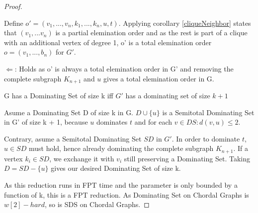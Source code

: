 \begin{proof}
\begin{subproof}
    Define $o' = (v_1, ..., v_n, k_1, ..., k_n, u, t)$. Applying corollary \ref*{cliqueNeighbor} states that $(v_1, ... v_n)$ is a partial elemination order and as the rest is part of a clique with an additional vertex of degree 1, o' is a total elemination order $o = (v_1, ..., b_n)$ for $G'$. 
    
    $\Leftarrow$: Holds as o' is always a total elemination order in G' and removing  the complete subgraph $K_{n+1}$ and $u$ gives a total elemination order in G.
    \end{subproof}


    \begin{corollary}
    G has a Dominating Set of size k iff $G'$ has a dominating set of size $k+1$
    \end{corollary}
    \begin{subproof}
    Asume a Dominating Set D of size k in G. $D \cup \{u\}$ is a Semitotal Dominating Set in G' of size k + 1, because $u$ dominates $t$ and for each $v \in DS: d(v, u) \leq 2$.

    Contrary, asume a Semitotal Dominating Set $SD$ in $G'$. In order to dominate $t$, $u \in SD$ must hold, hence already dominating the complete subgraph $K_{n+1}$. If a vertex $k_i \in SD$, we exchange it with $v_i$ still preserving a Dominating Set. Taking $D = SD - \{ u \}$ gives our desired Dominating Set of size k.
    \end{subproof}
    As this reduction runs in FPT time and the parameter is only bounded by a function of k, this is a FPT reduction. As Dominating Set on Chordal Graphs is $w[2]-hard$, so is SDS on Chordal Graphs.

\end{proof}
